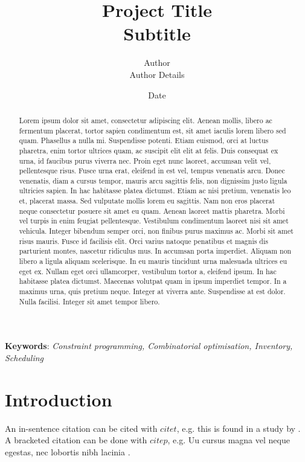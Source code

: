 \documentclass[a4paper, 11pt]{article}
\title{\textbf{Project Title} \\ Subtitle}
\author{Author \\ Author Details}
\date{Date}
\providecommand{\keywords}[1]
{
  \small	
  \textbf{Keywords}: \textit{#1}
}
\begin{document}
\maketitle

\begin{abstract}

Lorem ipsum dolor sit amet, consectetur adipiscing elit. Aenean mollis, libero ac fermentum placerat, tortor sapien condimentum est, sit amet iaculis lorem libero sed quam. Phasellus a nulla mi. Suspendisse potenti. Etiam euismod, orci at luctus pharetra, enim tortor ultrices quam, ac suscipit elit elit at felis. Duis consequat ex urna, id faucibus purus viverra nec. Proin eget nunc laoreet, accumsan velit vel, pellentesque risus. Fusce urna erat, eleifend in est vel, tempus venenatis arcu. Donec venenatis, diam a cursus tempor, mauris arcu sagittis felis, non dignissim justo ligula ultricies sapien. In hac habitasse platea dictumst. Etiam ac nisi pretium, venenatis leo et, placerat massa. Sed vulputate mollis lorem eu sagittis. Nam non eros placerat neque consectetur posuere sit amet eu quam. Aenean laoreet mattis pharetra. Morbi vel turpis in enim feugiat pellentesque. Vestibulum condimentum laoreet nisi sit amet vehicula. Integer bibendum semper orci, non finibus purus maximus ac. Morbi sit amet risus mauris. Fusce id facilisis elit. Orci varius natoque penatibus et magnis dis parturient montes, nascetur ridiculus mus. In accumsan porta imperdiet. Aliquam non libero a ligula aliquam scelerisque. In eu mauris tincidunt urna malesuada ultrices eu eget ex. Nullam eget orci ullamcorper, vestibulum tortor a, eleifend ipsum. In hac habitasse platea dictumst. Maecenas volutpat quam in ipsum imperdiet tempor. In a maximus urna, quis pretium neque. Integer at viverra ante. Suspendisse at est dolor. Nulla facilisi. Integer sit amet tempor libero.

\end{abstract}

\keywords{Constraint programming, Combinatorial optimisation, Inventory, Scheduling}

\pagebreak

\section{Introduction}
\label{section:introduction}

An in-sentence citation can be cited with $citet$, e.g. this is found in a study by \citet{Ferreira2013}. A bracketed citation can be done with $citep$, e.g. Uu cursus magna vel neque egestas, nec lobortis nibh lacinia \citep{Pepic2018}. 
\end{document}
